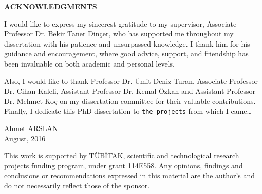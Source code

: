 \newpage
\doublespacing

\begin{center}{\textbf{ACKNOWLEDGMENTS}}\end{center}

I would like to express my sincerest gratitude to my supervisor, Associate Professor Dr. Bekir Taner Din\c{c}er, who has supported me throughout my dissertation with his patience and unsurpassed knowledge. I thank him for his guidance and encouragement, where good advice, support, and friendship has been invaluable on both academic and personal levels.

Also, I would like to thank Professor Dr. \"{U}mit Deniz Turan, Associate Professor Dr. Cihan Kaleli, Assistant Professor Dr. Kemal \"{O}zkan and Assistant Professor Dr. Mehmet Ko\c{c} on my dissertation committee for their valuable contributions. \\

\noindent
Finally, I dedicate this PhD dissertation to \texttt{the projects} from which I came\ldots  \\

\begin{flushright}
Ahmet ARSLAN \\  August, 2016
\end{flushright}

\vspace{7.2cm} 

\noindent
{\small This work is supported by T\"{U}B\.{I}TAK, scientific and technological research projects funding program, under grant 114E558. Any opinions, findings and conclusions or recommendations expressed in this material are the author's and do not necessarily reflect those of the sponsor.}